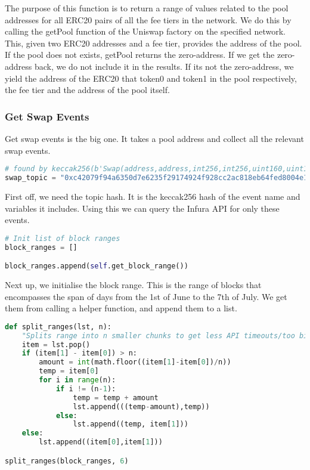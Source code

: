 The purpose of this function is to return a range of values related to the pool addresses for all ERC20 pairs of all the fee tiers in the network. We do this by calling the getPool function of the Uniswap factory on the specified network. This, given two ERC20 addresses and a fee tier, provides the address of the pool. If the pool does not exists, getPool returns the zero-address. If we get the zero-address back, we do not include it in the results. If its not the zero-address, we yield the address of the ERC20 that token0 and token1 in the pool respectively, the fee tier and the address of the pool itself.

\subsubsection{Get Swap Events}

Get swap events is the big one. It takes a pool address and collect all the relevant swap events. 

\begin{lstlisting}[language=python]
# found by keccak256(b'Swap(address,address,int256,int256,uint160,uint128,int24)')
swap_topic = "0xc42079f94a6350d7e6235f29174924f928cc2ac818eb64fed8004e115fbcca67"
\end{lstlisting}

First off, we need the topic hash. It is the keccak256 hash of the event name and variables it includes. Using this we can query the Infura API for only these events.

\begin{lstlisting}[language=python]
# Init list of block ranges
block_ranges = []

block_ranges.append(self.get_block_range())
\end{lstlisting}

Next up, we initialise the block range. This is the range of blocks that encompasses the span of days from the 1st of June to the 7th of July. We get them from calling a helper function, and append them to a list.


\begin{lstlisting}[language=python]
def split_ranges(lst, n):
    "Splits range into n smaller chunks to get less API timeouts/too big response erros"
    item = lst.pop()
    if (item[1] - item[0]) > n:
        amount = int(math.floor((item[1]-item[0])/n))
        temp = item[0]
        for i in range(n):
            if i != (n-1):
                temp = temp + amount
                lst.append(((temp-amount),temp))
            else:
                lst.append((temp, item[1]))
    else:
        lst.append((item[0],item[1]))

split_ranges(block_ranges, 6)
\end{lstlisting}

